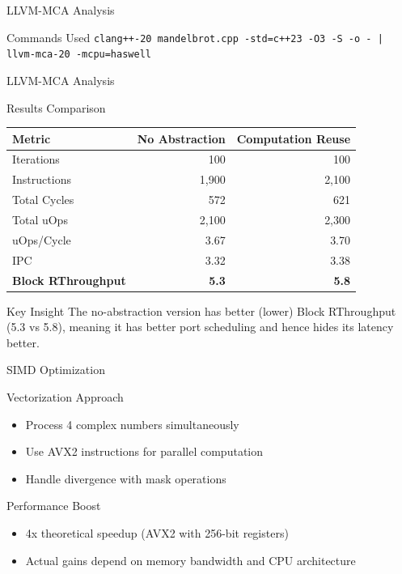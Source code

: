 \documentclass{beamer}
\begin{document}
\begin{frame}{LLVM-MCA Analysis}
    \begin{block}{Commands Used}
        \texttt{clang++-20 mandelbrot.cpp -std=c++23 -O3 -S -o - | llvm-mca-20 -mcpu=haswell}\\
    \end{block}
\end{frame}

\begin{frame}{LLVM-MCA Analysis}    
    \begin{block}{Results Comparison}
        \begin{tabular}{lrr}
            \textbf{Metric} & \textbf{No Abstraction} & \textbf{Computation Reuse} \\
            \hline
            Iterations & 100 & 100 \\
            Instructions & 1,900 & 2,100 \\
            Total Cycles & 572 & 621 \\
            Total uOps & 2,100 & 2,300 \\
            \hline
            uOps/Cycle & 3.67 & 3.70 \\
            IPC & 3.32 & 3.38 \\
            \textbf{Block RThroughput} & \textbf{5.3} & \textbf{5.8} \\
        \end{tabular}
    \end{block}
    
    \begin{alertblock}{Key Insight}
        The no-abstraction version has better (lower) Block RThroughput (5.3 vs 5.8), meaning it has better port scheduling and hence hides its latency better.
    \end{alertblock}
\end{frame}


\begin{frame}{SIMD Optimization}
    \begin{block}{Vectorization Approach}
        \begin{itemize}
            \item Process 4 complex numbers simultaneously
            \item Use AVX2 instructions for parallel computation
            \item Handle divergence with mask operations
        \end{itemize}
    \end{block}
    \begin{block}{Performance Boost}
        \begin{itemize}
            \item 4x theoretical speedup (AVX2 with 256-bit registers)
            \item Actual gains depend on memory bandwidth and CPU architecture
        \end{itemize}
    \end{block}
\end{frame}
\end{document}
